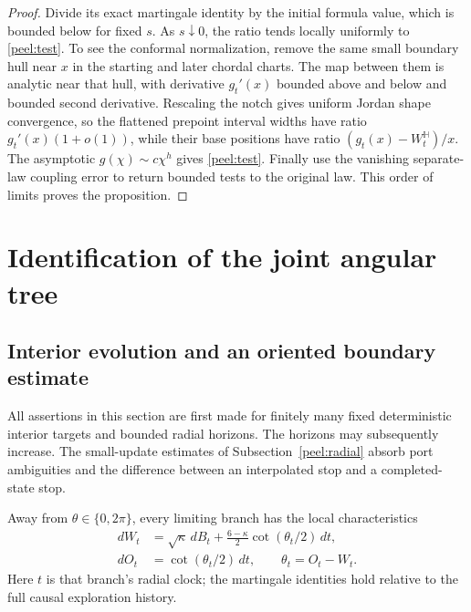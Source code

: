 \begin{proof}
Divide its exact martingale identity by the initial formula value,
which is bounded below for fixed $s$.  As $s\downarrow0$, the ratio
tends locally uniformly to \eqref{peel:test}.  To see the conformal
normalization, remove the same small boundary hull near $x$ in the
starting and later chordal charts.  The map between them is analytic
near that hull, with derivative $g_t'(x)$ bounded above and below and
bounded second derivative.  Rescaling the notch gives uniform Jordan
shape convergence, so the flattened prepoint interval widths have
ratio $g_t'(x)(1+o(1))$, while their base positions have ratio
$(g_t(x)-W_t^{\mathbb H})/x$.  The asymptotic
$g(\chi)\sim c\chi^h$ gives \eqref{peel:test}.  Finally use the
vanishing separate-law coupling error to return bounded tests to the
original law.  This order of limits proves the proposition.
\end{proof}

\section{Identification of the joint angular tree}
\label{sec:tree}

\subsection{Interior evolution and an oriented boundary estimate}
\label{tree:tightness}

All assertions in this section are first made for finitely many
fixed deterministic interior targets and bounded radial horizons.
The horizons may subsequently increase.  The small-update estimates
of Subsection~\ref{peel:radial} absorb port ambiguities and the difference
between an interpolated stop and a completed-state stop.

\begin{lemma}\label{tree:interior}
Away from $\theta\in\{0,2\pi\}$, every limiting branch has the local
characteristics
\begin{equation}\label{tree:sde}
 \begin{aligned}
 dW_t&=\sqrt\kappa\,dB_t+
          \frac{6-\kappa}{2}\cot(\theta_t/2)\,dt,\\
 dO_t&=\cot(\theta_t/2)\,dt,\qquad \theta_t=O_t-W_t.
 \end{aligned}
\end{equation}
Here $t$ is that branch's radial clock; the martingale identities hold
relative to the full causal exploration history.
\end{lemma}

